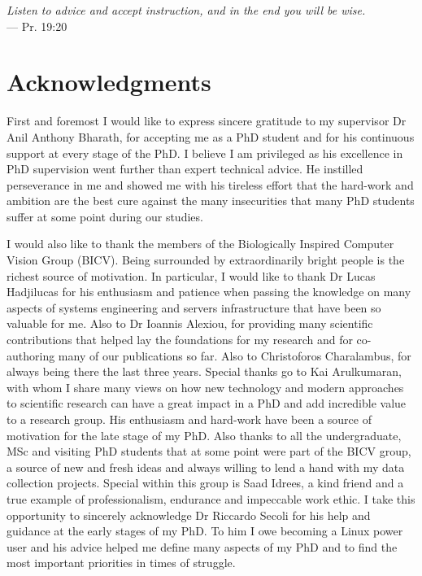 
\begin{flushright}{\slshape    
   Listen to advice and accept instruction, and in the end you will be wise.} \\ \medskip
    --- Pr. 19:20
\end{flushright}



\bigskip

\begingroup
\let\clearpage\relax
\let\cleardoublepage\relax
\let\cleardoublepage\relax
\chapter*{Acknowledgments}

First and foremost I would like to express sincere gratitude to my supervisor Dr Anil Anthony Bharath, for accepting me as a PhD student and for his continuous support at every stage of the PhD. I believe I am privileged as his excellence in PhD supervision went further than expert technical advice. He instilled perseverance in me and showed me with his tireless effort that the hard-work and ambition are the best cure against the many insecurities that many PhD students suffer at some point during our studies.

I would also like to thank the members of the Biologically Inspired Computer Vision Group (BICV). Being surrounded by extraordinarily bright people is the richest source of motivation. In particular, I would like to thank Dr Lucas Hadjilucas for his enthusiasm and patience when passing the knowledge on many aspects of systems engineering and servers infrastructure that have been so valuable for me. Also to Dr Ioannis Alexiou, for providing many scientific contributions that helped lay the foundations for my research and for co-authoring many of our publications so far. Also to Christoforos Charalambus, for always being there the last three years. Special thanks go to Kai Arulkumaran, with whom I share many views on how new technology and modern approaches to scientific research can have a great impact in a PhD and add incredible value to a research group. His enthusiasm  and hard-work have been a source of motivation for the late stage of my PhD. Also thanks to all the undergraduate, MSc and visiting PhD students that at some point were part of the BICV group, a source of new and fresh ideas and always willing to lend a hand with my data collection projects. Special within this group is Saad Idrees, a kind friend and a true example of professionalism, endurance and impeccable work ethic. I take this opportunity to sincerely acknowledge Dr Riccardo Secoli for his help and guidance at the early stages of my PhD. To him I owe becoming a Linux power user and his advice helped me define many aspects of my PhD and to find the most important priorities in times of struggle.

